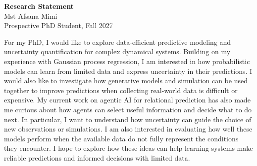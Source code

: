 \documentclass[11pt,letterpaper]{article}
\begin{document}
\begin{center}
  {\Large\bfseries Research Statement}\\[6pt]
  {\large Mst Afsana Mimi}\\[4pt]
  {\small Prospective PhD Student, Fall 2027}
\end{center}
\vspace{2pt}

For my PhD, I would like to explore data-efficient predictive modeling and uncertainty quantification for complex dynamical systems. Building on my experience with Gaussian process regression, I am interested in how probabilistic models can learn from limited data and express uncertainty in their predictions. I would also like to investigate how generative models and simulation can be used together to improve predictions when collecting real-world data is difficult or expensive. My current work on agentic AI for relational prediction has also made me curious about how agents can select useful information and decide what to do next. In particular, I want to understand how uncertainty can guide the choice of new observations or simulations. I am also interested in evaluating how well these models perform when the available data do not fully represent the conditions they encounter. I hope to explore how these ideas can help learning systems make reliable predictions and informed decisions with limited data.
\end{document}

